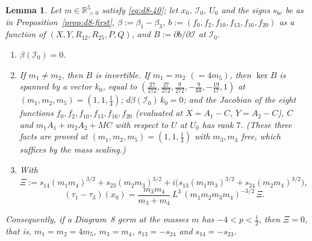 \documentclass[11pt]{amsart}
\newenvironment{alphalist}{\begin{enumerate}\renewcommand{\labelenumi}{(\alph{enumi})}%
  \renewcommand{\theenumi}{\alph{enumi}}}{\end{enumerate}}
\newtheorem{lemma}[theorem]{Lemma}
\theoremstyle{definition}
\theoremstyle{remark}
\newcommand{\Rp}{\mathbb{R}_{>0}}
\begin{document}
{\begin{lemma}\label{lem:d8-kappa}
Let $m\in\Rp^5$ satisfy \eqref{eq:d8-40}; let $x_0$, $\mathcal I_0$, $U_0$ and the signs
$s_{bc}$ be as in Proposition~\ref{prop:d8-first}, $\beta:=\beta_1-\beta_3$,
$b:=(f_0,f_2,f_{10},f_{13},f_{16},f_{20})$ as a function of
$(X,Y,R_{12},R_{25},P,Q)$, and $B:=\partial b/\partial\mathcal I$ at $\mathcal I_0$.
\begin{alphalist}
\item $\beta(\mathcal I_0)=0$.
\item If $m_1\ne m_2$, then $B$ is invertible.  If $m_1=m_2$ $(=4m_5)$, then $\ker B$ is spanned
by a vector $k_0$, equal to $(\frac{27}{272},\frac{27}{272},\frac9{272},-\frac9{68},-\frac{19}{17},1)$
at $(m_1,m_2,m_5)=(1,1,\frac14)$; $d\beta(\mathcal I_0)\,k_0=0$; and the Jacobian of the eight
functions $f_0,f_2,f_{10},f_{13},f_{16},f_{20}$ (evaluated at $X=A_1-C$, $Y=A_2-C$), $C$ and
$m_1A_1+m_2A_2+MC$ with respect to $U$ at $U_0$ has rank $7$.  (These three facts are proved
at $(m_1,m_2,m_5)=(1,1,\frac14)$ with $m_3,m_4$ free, which suffices by the mass scaling.)
\item With $\Xi:=s_{14}(m_1m_4)^{3/2}+s_{23}(m_2m_3)^{3/2}
+i\bigl(s_{13}(m_1m_3)^{3/2}+s_{24}(m_2m_4)^{3/2}\bigr)$,
\[
  (\tau_1-\tau_3)(x_0)=\frac{m_3m_4}{m_3+m_4}\,L^3\,(m_1m_2m_3m_4)^{-3/2}\,\Xi .
\]
\end{alphalist}
Consequently, if a Diagram~8 germ at the masses $m$ has $-4<p<\frac12$, then $\Xi=0$, that is,
$m_1=m_2=4m_5$, $m_3=m_4$, $s_{13}=-s_{24}$ and $s_{14}=-s_{23}$.
\end{lemma}}
\end{document}
